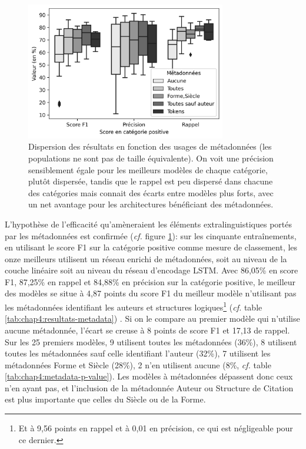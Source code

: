 \begin{figure}[ht]
    \centering
    \includegraphics[height=6cm]{figures/chap4/scoreMetadata.png}
    \caption{Dispersion des résultats en fonction des usages de métadonnées (les populations ne sont pas de taille équivalente). On voit une précision sensiblement égale pour les meilleurs modèles de chaque catégorie, plutôt dispersée, tandis que le rappel est peu dispersé dans chacune des catégories mais connait des écarts entre modèles plus forts, avec un net avantage pour les architectures bénéficiant des métadonnées.}
    \label{fig:chap4:metadata-boxplot}
\end{figure}

L'hypothèse de l'efficacité qu'amèneraient les éléments extralinguistiques portés par les métadonnées est confirmée (\textit{cf.} figure \ref{fig:chap4:metadata-boxplot}): sur les cinquante entraînements, en utilisant le score F1 sur la catégorie positive comme mesure de classement, les onze meilleurs utilisent un réseau enrichi de métadonnées, soit au niveau de la couche linéaire soit au niveau du réseau d'encodage LSTM. Avec 86,05\% en score F1, 87,25\% en rappel et 84,88\% en précision sur la catégorie positive, le meilleur des modèles se situe à 4,87 points du score F1 du meilleur modèle n'utilisant pas les métadonnées identifiant les auteurs et structures logiques\footnote{Et à 9,56 points en rappel et à 0,01 en précision, ce qui est négligeable pour ce dernier.} (\textit{cf.} table \ref{tab:chap4:resultats-metadata}) . Si on le compare au premier modèle qui n'utilise aucune métadonnée, l'écart se creuse à 8 points de score F1 et 17,13 de rappel. Sur les 25 premiers modèles, 9 utilisent toutes les métadonnées (36\%), 8 utilisent toutes les métadonnées sauf celle identifiant l'auteur (32\%), 7 utilisent les métadonnées Forme et Siècle (28\%), 2 n'en utilisent aucune (8\%, \textit{cf.} table \ref{tab:chap4:metadata-p-value}). Les modèles à métadonnées dépassent donc ceux n'en ayant pas, et l'inclusion de la métadonnée Auteur ou Structure de Citation est plus importante que celles du Siècle ou de la Forme.



